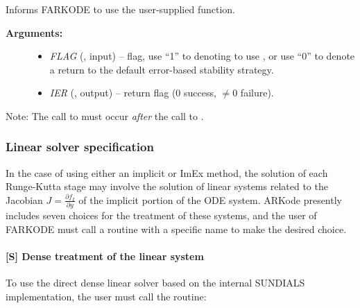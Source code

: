 \documentclass[letterpaper,10pt,english]{sphinxmanual}
\begin{document}
\begin{fulllineitems}
\label{f_interface/Usage:f/_/FARKEXPSTABSET}
Informs FARKODE to use the user-supplied {\hyperref[f_interface/Usage:f/_/FARKEXPSTAB]{}} function.
\begin{description}
\item[{\textbf{Arguments:}}] \leavevmode\begin{itemize}
\item {} 
\emph{FLAG} (, input) -- flag, use ``1'' to denoting to use
{\hyperref[f_interface/Usage:f/_/FARKEXPSTAB]{}}, or use ``0'' to denote a return to the
default error-based stability strategy.

\item {} 
\emph{IER} (, output) -- return flag (0 success, $\ne
0$ failure).

\end{itemize}

\end{description}

Note: The call to {\hyperref[f_interface/Usage:f/_/FARKEXPSTABSET]{}} must occur \emph{after} the call
to {\hyperref[f_interface/Usage:f/_/FARKMALLOC]{}}.

\end{fulllineitems}



\subsubsection{Linear solver specification}
\label{f_interface/Usage:finterface-linearsolver}\label{f_interface/Usage:linear-solver-specification}
In the case of using either an implicit or ImEx method, the solution
of each Runge-Kutta stage may involve the solution of linear systems
related to the Jacobian $J = \frac{\partial f_I}{\partial y}$ of
the implicit portion of the ODE system. ARKode presently includes
seven choices for the treatment of these systems, and the user of
FARKODE must call a routine with a specific name to make the
desired choice.


\paragraph{{[}\textbf{S}{]} Dense treatment of the linear system}
\label{f_interface/Usage:s-dense-treatment-of-the-linear-system}
To use the direct dense linear solver based on the internal SUNDIALS
implementation, the user must call the {\hyperref[f_interface/Usage:f/_/FARKDENSE]{}} routine:
\end{document}
